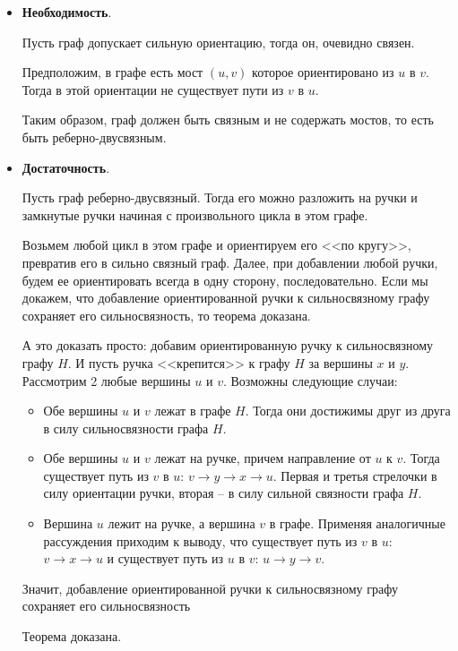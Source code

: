 \documentclass[russian]{article}
\begin{document}
\begin{itemize}
\item \textbf{Необходимость}. 

Пусть граф допускает сильную ориентацию, тогда он, очевидно связен.

Предположим, в графе есть мост $(u, v)$ которое ориентировано из $u$ в $v$. Тогда в этой ориентации не существует пути из $v$ в $u$. 

Таким образом, граф должен быть связным и не содержать мостов, то есть быть реберно-двусвязным.

\item \textbf{Достаточность}.

Пусть граф реберно-двусвязный. Тогда его можно разложить на ручки и замкнутые ручки начиная с произвольного цикла в этом графе.

Возьмем любой цикл в этом графе и ориентируем его <<по кругу>>, превратив его в сильно связный граф. Далее, при добавлении любой ручки, будем ее ориентировать всегда в одну сторону, последовательно. Если мы докажем, что добавление ориентированной ручки к сильносвязному графу сохраняет его сильносвязность, то теорема доказана.

А это доказать просто: добавим ориентированную ручку к сильносвязному графу $H$. И пусть ручка <<крепится>> к графу $H$ за вершины $x$ и $y$. Рассмотрим 2 любые вершины $u$ и $v$. Возможны следующие случаи:

\begin{itemize}
\item Обе вершины $u$ и $v$ лежат в графе $H$. Тогда они достижимы друг из друга в силу сильносвязности графа $H$.

\item Обе вершины $u$ и $v$ лежат на ручке, причем направление от $u$ к $v$. Тогда существует путь из $v$ в $u$: $v \rightarrow y \rightarrow x \rightarrow u$. Первая и третья стрелочки в силу ориентации ручки, вторая -- в силу сильной связности графа $H$.

\item Вершина $u$ лежит на ручке, а вершина $v$ в графе. Применяя аналогичные рассуждения приходим к выводу, что существует путь из $v$ в $u$: $v \rightarrow x \rightarrow u$ и существует путь из $u$ в $v$: $u \rightarrow y \rightarrow v$. 
\end{itemize}

Значит, добавление ориентированной ручки к сильносвязному графу сохраняет его сильносвязность

Теорема доказана.
\end{itemize}
\end{document}
